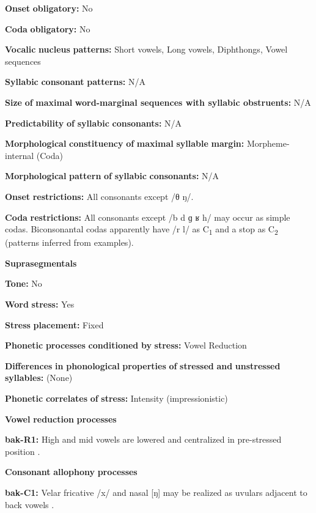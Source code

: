\begin{styleBody}
\textbf{Onset} \textbf{obligatory:} No

\textbf{Coda} \textbf{obligatory:} No

\textbf{Vocalic} \textbf{nucleus} \textbf{patterns:} Short vowels, Long vowels, Diphthongs, Vowel sequences

\textbf{Syllabic} \textbf{consonant} \textbf{patterns:} N/A

\textbf{Size} \textbf{of} \textbf{maximal} \textbf{word{}-marginal sequences with syllabic obstruents:} N/A

\textbf{Predictability} \textbf{of} \textbf{syllabic} \textbf{consonants:} N/A

\textbf{Morphological} \textbf{constituency} \textbf{of} \textbf{maximal} \textbf{syllable} \textbf{margin:} Morpheme-internal (Coda)

\textbf{Morphological} \textbf{pattern} \textbf{of} \textbf{syllabic} \textbf{consonants:} N/A

\textbf{Onset} \textbf{restrictions:} All consonants except /θ ŋ/.

\textbf{Coda} \textbf{restrictions:} All consonants except /b d ɡ ʁ h/ may occur as simple codas. Biconsonantal codas apparently have /r l/ as C\textsubscript{1} and a stop as C\textsubscript{2} (patterns inferred from examples).

\textbf{Suprasegmentals}

\textbf{Tone:} No

\textbf{Word} \textbf{stress:} Yes

\textbf{Stress} \textbf{placement:} Fixed

\textbf{Phonetic} \textbf{processes} \textbf{conditioned} \textbf{by} \textbf{stress:} Vowel Reduction

\textbf{Differences} \textbf{in} \textbf{phonological} \textbf{properties} \textbf{of} \textbf{stressed} \textbf{and} \textbf{unstressed} \textbf{syllables:} (None)

\textbf{Phonetic} \textbf{correlates} \textbf{of} \textbf{stress:} Intensity (impressionistic)

\textbf{Vowel} \textbf{reduction} \textbf{processes}

\textbf{bak-R1:} High and mid vowels are lowered and centralized in pre-stressed position \citep{BerksonEtAl2016}.

\textbf{Consonant} \textbf{allophony} \textbf{processes}

\textbf{bak-C1:} Velar fricative /x/ and nasal [ŋ] may be realized as uvulars adjacent to back vowels \citep[11]{Poppe1964}.


\end{styleBody}
